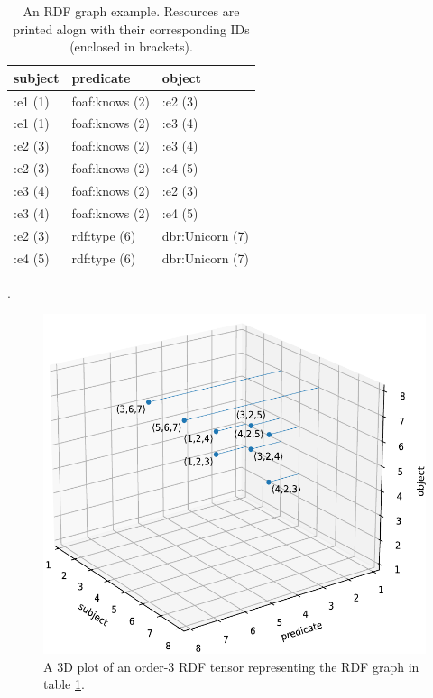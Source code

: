 \begin{table}[h]
	\centering
	\begin{tabular}{lll}
		\textbf{subject} & \textbf{predicate} & \textbf{object} \\ \hline
		:e1 (1) & foaf:knows (2) & :e2 (3) \\
		:e1 (1) & foaf:knows (2) & :e3 (4) \\
		:e2 (3) & foaf:knows (2) & :e3 (4) \\
		:e2 (3) & foaf:knows (2) & :e4 (5)  \\
		:e3 (4) & foaf:knows (2) & :e2 (3) \\ 
		:e3 (4) & foaf:knows (2) & :e4 (5) \\
		:e2 (3) & rdf:type (6) & dbr:Unicorn (7) \\
		:e4 (5) & rdf:type (6) & dbr:Unicorn (7) \\
	\end{tabular}
	\caption{An RDF graph example. Resources are printed alogn with their corresponding IDs (enclosed in brackets).}. 
	\label{tab:rdf_tensor}
\end{table}

\begin{figure}[h]
	\centering
	\includegraphics{figures/chapter2/3Dcoord-cut}
	\caption{A 3D plot of an order-3 RDF tensor representing the RDF graph in table \ref{tab:rdf_tensor}.}
	\label{fig:rdf_tensor}
\end{figure}

